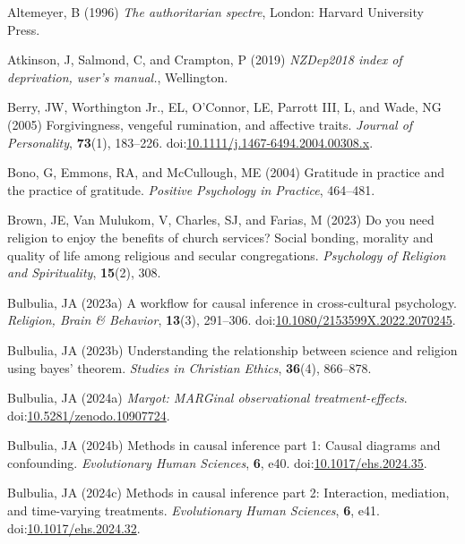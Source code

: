 \documentclass[
  single column]{article}
\newlength{\cslhangindent}
\newenvironment{CSLReferences}[2] %
 {\begin{list}{}{%
  \setlength{\itemindent}{0pt}
  \setlength{\leftmargin}{0pt}
  \setlength{\parsep}{0pt}
  \ifodd #1
   \setlength{\leftmargin}{\cslhangindent}
   \setlength{\itemindent}{-1\cslhangindent}
  \fi
  \setlength{\itemsep}{#2\baselineskip}}}
 {\end{list}}
\begin{document}
\label{refs}
\begin{CSLReferences}{1}{0}
Altemeyer, B (1996) \emph{The authoritarian spectre}, London: Harvard
University Press.

Atkinson, J, Salmond, C, and Crampton, P (2019) \emph{NZDep2018 index of
deprivation, user{'}s manual.}, Wellington.

Berry, JW, Worthington Jr., EL, O'Connor, LE, Parrott III, L, and Wade,
NG (2005) Forgivingness, vengeful rumination, and affective traits.
\emph{Journal of Personality}, \textbf{73}(1), 183--226.
doi:\href{https://doi.org/10.1111/j.1467-6494.2004.00308.x}{10.1111/j.1467-6494.2004.00308.x}.

Bono, G, Emmons, RA, and McCullough, ME (2004) Gratitude in practice and
the practice of gratitude. \emph{Positive Psychology in Practice},
464--481.

Brown, JE, Van Mulukom, V, Charles, SJ, and Farias, M (2023) Do you need
religion to enjoy the benefits of church services? Social bonding,
morality and quality of life among religious and secular congregations.
\emph{Psychology of Religion and Spirituality}, \textbf{15}(2), 308.

Bulbulia, JA (2023a) A workflow for causal inference in cross-cultural
psychology. \emph{Religion, Brain \& Behavior}, \textbf{13}(3),
291--306.
doi:\href{https://doi.org/10.1080/2153599X.2022.2070245}{10.1080/2153599X.2022.2070245}.

Bulbulia, JA (2023b) Understanding the relationship between science and
religion using bayes' theorem. \emph{Studies in Christian Ethics},
\textbf{36}(4), 866--878.

Bulbulia, JA (2024a) \emph{Margot: MARGinal observational
treatment-effects}.
doi:\href{https://doi.org/10.5281/zenodo.10907724}{10.5281/zenodo.10907724}.

Bulbulia, JA (2024b) Methods in causal inference part 1: Causal diagrams
and confounding. \emph{Evolutionary Human Sciences}, \textbf{6}, e40.
doi:\href{https://doi.org/10.1017/ehs.2024.35}{10.1017/ehs.2024.35}.

Bulbulia, JA (2024c) Methods in causal inference part 2: Interaction,
mediation, and time-varying treatments. \emph{Evolutionary Human
Sciences}, \textbf{6}, e41.
doi:\href{https://doi.org/10.1017/ehs.2024.32}{10.1017/ehs.2024.32}.


\end{CSLReferences}
\end{document}
